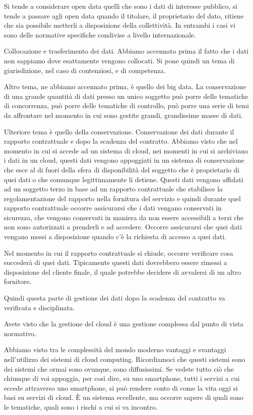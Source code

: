 Si tende a considerare open data quelli che sono i dati di interesse pubblico, si tende a passare agli open data quando il titolare, il proprietario del dato, ritiene che sia possibile metterli a disposizione della collettività. In entrambi i casi vi sono delle normative specifiche condivise a livello internazionale. 

Collocazione e trasferimento dei dati. Abbiamo accennato prima il fatto che i dati non sappiamo dove esattamente vengono collocati. Si pone quindi un tema di giurisdizione, nel caso di contenziosi, e di competenza. 

Altro tema, ne abbiamo accennato prima, è quello dei big data. La conservazione di una grande quantità di dati presso un unico soggetto può porre delle tematiche di concorrenza, può porre delle tematiche di controllo, può porre una serie di temi da affrontare nel momento in cui sono gestite grandi, grandissime masse di dati. 

Ulteriore tema è quello della conservazione. Conservazione dei dati durante il rapporto contrattuale e dopo la scadenza del contratto. Abbiamo visto che nel momento in cui si accede ad un sistema di cloud, nei momenti in cui si archiviano i dati in un cloud, questi dati vengono appoggiati in un sistema di conservazione che esce al di fuori della sfera di disponibilità del soggetto che è proprietario di quei dati o che comunque legittimamente li detiene. Questi dati vengono affidati ad un soggetto terzo in base ad un rapporto contrattuale che stabilisce la regolamentazione del rapporto nella fornitura del servizio e quindi durante quel rapporto contrattuale occorre assicurarsi che i dati vengano conservati in sicurezza, che vengono conservati in maniera da non essere accessibili a terzi che non sono autorizzati a prenderli e ad accedere. Occorre assicurarsi che quei dati vengano messi a disposizione quando c'è la richiesta di accesso a quei dati. 

Nel momento in cui il rapporto contrattuale si chiude, occorre verificare cosa succederà di quei dati. Tipicamente questi dati dovrebbero essere rimessi a disposizione del cliente finale, il quale potrebbe decidere di avvalersi di un altro fornitore. 

Quindi questa parte di gestione dei dati dopo la scadenza del contratto va verificata e disciplinata. 

Avete visto che la gestione del cloud è una gestione complessa dal punto di vista normativo.

Abbiamo visto tra le complessità del mondo moderno vantaggi e svantaggi nell'utilizzo dei sistemi di cloud computing. Ricordiamoci che questi sistemi sono dei sistemi che ormai sono ovunque, sono diffusissimi. Se vedete tutto ciò che chiunque di voi appoggia, per così dire, su uno smartphone, tutti i servizi a cui eccede attraverso uno smartphone, si può rendere conto di come la vita oggi si basi su servizi di cloud. È un sistema eccellente, ma occorre sapere di quali sono le tematiche, quali sono i rischi a cui si va incontro.

